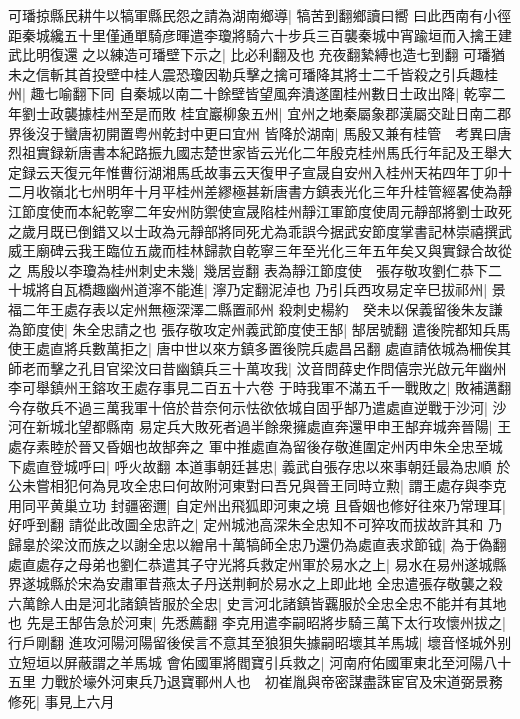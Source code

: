 可璠掠縣民耕牛以犒軍縣民怨之請為湖南鄉導|{
	犒苦到翻鄉讀曰嚮}
曰此西南有小徑距秦城纔五十里僅通單騎彦暉遣李瓊將騎六十步兵三百襲秦城中宵踰垣而入擒王建武比明復還之以練造可璠壁下示之|{
	比必利翻及也充夜翻縶縛也造七到翻}
可璠猶未之信斬其首投壁中桂人震恐瓊因勒兵擊之擒可璠降其將士二千皆殺之引兵趣桂州|{
	趣七喻翻下同}
自秦城以南二十餘壁皆望風奔潰遂圍桂州數日士政出降|{
	乾寜二年劉士政襲據桂州至是而敗}
桂宜巖柳象五州|{
	宜州之地秦屬象郡漢屬交趾日南二郡界後沒于蠻唐初開置粤州乾封中更曰宜州}
皆降於湖南|{
	馬殷又兼有桂管　考異曰唐烈祖實録新唐書本紀路振九國志楚世家皆云光化二年殷克桂州馬氏行年記及王舉大定録云天復元年惟曹衍湖湘馬氐故事云天復甲子宣晟自安州入桂州天祐四年丁卯十二月收嶺北七州明年十月平桂州差繆極甚新唐書方鎮表光化三年升桂管經畧使為靜江節度使而本紀乾寧二年安州防禦使宣晟陷桂州靜江軍節度使周元靜部將劉士政死之歲月既已倒錯又以士政為元靜部將同死尤為乖誤今据武安節度掌書記林崇禧撰武威王廟碑云我王臨位五歲而桂林歸款自乾寧三年至光化三年五年矣又與實録合故從之}
馬殷以李瓊為桂州刺史未幾|{
	幾居豈翻}
表為靜江節度使　張存敬攻劉仁恭下二十城將自瓦橋趣幽州道濘不能進|{
	濘乃定翻泥淖也}
乃引兵西攻易定辛巳拔祁州|{
	景福二年王處存表以定州無極深澤二縣置祁州}
殺刺史楊約　癸未以保義留後朱友謙為節度使|{
	朱全忠請之也}
張存敬攻定州義武節度使王郜|{
	郜居號翻}
遣後院都知兵馬使王處直將兵數萬拒之|{
	唐中世以來方鎮多置後院兵處昌呂翻}
處直請依城為柵俟其師老而擊之孔目官梁汶曰昔幽鎮兵三十萬攻我|{
	汶音問薛史作問僖宗光啟元年幽州李可舉鎮州王鎔攻王處存事見二百五十六卷}
于時我軍不滿五千一戰敗之|{
	敗補邁翻}
今存敬兵不過三萬我軍十倍於昔奈何示怯欲依城自固乎郜乃遣處直逆戰于沙河|{
	沙河在新城北望都縣南}
易定兵大敗死者過半餘衆擁處直奔還甲申王郜弃城奔晉陽|{
	王處存素睦於晉又昏姻也故郜奔之}
軍中推處直為留後存敬進圍定州丙申朱全忠至城下處直登城呼曰|{
	呼火故翻}
本道事朝廷甚忠|{
	義武自張存忠以來事朝廷最為忠順}
於公未嘗相犯何為見攻全忠曰何故附河東對曰吾兄與晉王同時立勲|{
	謂王處存與李克用同平黄巢立功}
封疆密邇|{
	自定州出飛狐即河東之境}
且昏姻也修好往來乃常理耳|{
	好呼到翻}
請從此改圖全忠許之|{
	定州城池高深朱全忠知不可猝攻而拔故許其和}
乃歸辠於梁汶而族之以謝全忠以繒帛十萬犒師全忠乃還仍為處直表求節钺|{
	為于偽翻}
處直處存之母弟也劉仁恭遣其子守光將兵救定州軍於易水之上|{
	易水在易州遂城縣界遂城縣於宋為安肅軍昔燕太子丹送荆軻於易水之上即此地}
全忠遣張存敬襲之殺六萬餘人由是河北諸鎮皆服於全忠|{
	史言河北諸鎮皆覊服於全忠全忠不能并有其地也}
先是王郜告急於河東|{
	先悉薦翻}
李克用遣李嗣昭將步騎三萬下太行攻懷州拔之|{
	行戶剛翻}
進攻河陽河陽留後侯言不意其至狼狽失據嗣昭壞其羊馬城|{
	壞音怪城外别立短垣以屏蔽謂之羊馬城}
會佑國軍將閻寶引兵救之|{
	河南府佑國軍東北至河陽八十五里}
力戰於壕外河東兵乃退寶鄆州人也　初崔胤與帝密謀盡誅宦官及宋道弼景務修死|{
	事見上六月}

